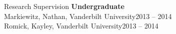 \begin{rSection}{\textrm{Research Supervision}}
{\large \textbf{Undergraduate}}\\
Markiewitz, Nathan, Vanderbilt University\hfill{2013 – 2014}\smallskip\\
Romick, Kayley, Vanderbilt University\hfill{2013 – 2014}
\end{rSection}